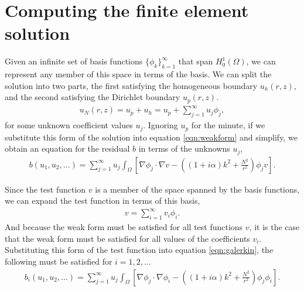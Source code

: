 \section{Computing the finite element solution}

\iffalse
Write in residual form
- don't be equal to 0, easier to write equations.

.We're given an infinite basis.
.Expand the solution in terms of the basis functions.
.Substitute this sum into the weak form.
.Represent test functions as sum of basis functions (Galerkin).
Perform truncation of the series.
Compute the weighted residual using numerical integration.
Compute the Jacobian matrix.
Solve the linear system (MG).
Obtain the finite element solution.
\fi

Given an infinite set of basis functions $\{ \phi_k \}_{k=1}^\infty$ that span $H^1_0(\Omega)$, we can represent any member of this space in terms of the basis.
We can split the solution into two parts, the first satisfying the homogeneous boundary $u_h(r,z)$, and the second satisfying the Dirichlet boundary $u_p(r,z)$.
\begin{align}
	u_N(r,z) = u_p + u_h = u_p + \sum_{j=1}^\infty u_j \phi_j,
\end{align}
for some unknown coefficient values $u_j$.
Ignoring $u_p$ for the minute, if we substitute this form of the solution into equation \eqref{eqn:weakform} and simplify, we obtain an equation for the residual $b$ in terms of the unknowns $u_j$,
\begin{align}
	b(u_1,u_2,\ldots) = \sum_{j=1}^\infty u_j \int_\Omega \left[ \nabla \phi_j \cdot \nabla v - \left( (1+i\alpha)k^2 + \frac{N^2}{r^2}\right) \phi_j v \right]. \label{eqn:galerkin}
\end{align}

Since the test function $v$ is a member of the space spanned by the basis functions, we can expand the test function in terms of this basis,
\begin{align}
	v = \sum_{i=1}^\infty v_i \phi_i.
\end{align}
And because the weak form must be satisfied for all test functions $v$, it is the case that the weak form must be satisfied for all values of the coefficients $v_i$.
Substituting this form of the test function into equation \eqref{eqn:galerkin}, the following must be satisfied for $i=1,2,\ldots$
\begin{align}
	b_i(u_1,u_2,\ldots)=\sum_{j=1}^\infty u_j \int_\Omega \left[ \nabla \phi_j \cdot \nabla \phi_i - \left( (1+i\alpha)k^2 + \frac{N^2}{r^2}\right) \phi_j \phi_i \right].
\end{align}


